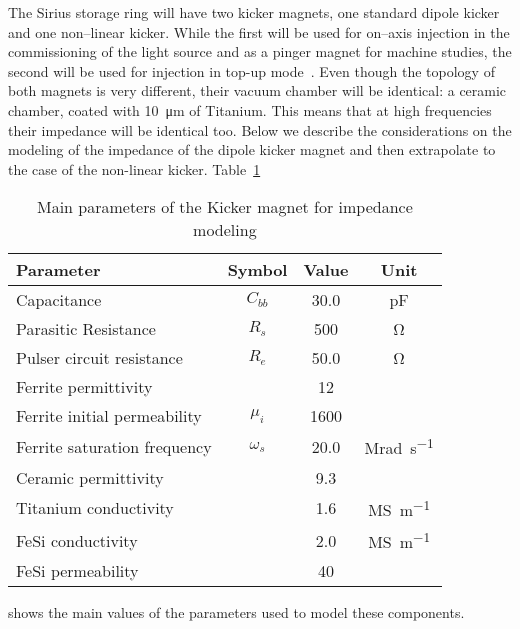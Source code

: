     The Sirius storage ring will have two kicker magnets, one standard dipole kicker and one non--linear kicker. While the first will be used for on--axis injection in the commissioning of the light source and as a pinger magnet for machine studies, the second will be used for injection in top-up mode~\cite{Liu2016a}. Even though the topology of both magnets is very different, their vacuum chamber will be identical: a ceramic chamber, coated with \SI{10}{\micro\meter} of Titanium. This means that at high frequencies their impedance will be identical too. Below we describe the considerations on the modeling of the impedance of the dipole kicker magnet and then extrapolate to the case of the non-linear kicker. Table~\ref{tab:kicker_paramters}
    \begin{table}
        \centering
        \caption{Main parameters of the Kicker magnet for impedance modeling}
        \label{tab:kicker_paramters}
        \begin{tabular}{lccc}
            \toprule
            Parameter                     & Symbol    & Value  & Unit \\
            \midrule
            Capacitance                   & $C_{bb}$  &  30.0  & \si{\pico\farad}\\
            Parasitic Resistance          & $R_s$     &  500   & \si{\ohm}\\
            Pulser circuit resistance     & $R_e$     &  50.0  & \si{\ohm}\\
            Ferrite permittivity          &           &   12   & \\
            Ferrite initial permeability  & $\mu_i$   &  1600  & \\
            Ferrite saturation frequency  & $\omega_s$&  20.0  & \si{\mega\radian\per\second}\\
            Ceramic permittivity          &           &  9.3   & \\
            Titanium conductivity         &           &  1.6   & \si{\mega\siemens\per\meter}\\
            FeSi conductivity             &           &  2.0   & \si{\mega\siemens\per\meter}\\
            FeSi permeability             &           & 40     & \\
            \bottomrule
        \end{tabular}
    \end{table}
    shows the main values of the parameters used to model these components.


